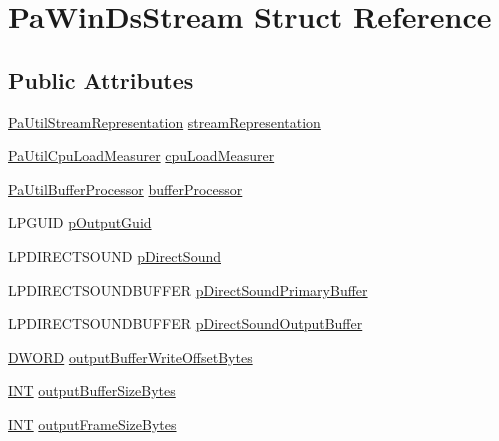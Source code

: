 \hypertarget{struct_pa_win_ds_stream}{}\section{Pa\+Win\+Ds\+Stream Struct Reference}
\label{struct_pa_win_ds_stream}
\subsection*{Public Attributes}
\begin{DoxyCompactItemize}
\item 
\hyperlink{struct_pa_util_stream_representation}{Pa\+Util\+Stream\+Representation} \hyperlink{struct_pa_win_ds_stream_a83364a8bef2314f9122dc397155d614a}{stream\+Representation}
\item 
\hyperlink{struct_pa_util_cpu_load_measurer}{Pa\+Util\+Cpu\+Load\+Measurer} \hyperlink{struct_pa_win_ds_stream_a607c1644f8f390244723e854e30cf167}{cpu\+Load\+Measurer}
\item 
\hyperlink{struct_pa_util_buffer_processor}{Pa\+Util\+Buffer\+Processor} \hyperlink{struct_pa_win_ds_stream_a9c2310a757d9246b054f6bb66e408806}{buffer\+Processor}
\item 
L\+P\+G\+U\+ID \hyperlink{struct_pa_win_ds_stream_a79765ea75ed4b2c47a077db25cd9b66e}{p\+Output\+Guid}
\item 
L\+P\+D\+I\+R\+E\+C\+T\+S\+O\+U\+ND \hyperlink{struct_pa_win_ds_stream_a463a306d8ee5fafbb86d0ffe16574b8c}{p\+Direct\+Sound}
\item 
L\+P\+D\+I\+R\+E\+C\+T\+S\+O\+U\+N\+D\+B\+U\+F\+F\+ER \hyperlink{struct_pa_win_ds_stream_a722c711a49c112dd449a310021f6a434}{p\+Direct\+Sound\+Primary\+Buffer}
\item 
L\+P\+D\+I\+R\+E\+C\+T\+S\+O\+U\+N\+D\+B\+U\+F\+F\+ER \hyperlink{struct_pa_win_ds_stream_a78946544af5046dd6ba8c723e849d1bb}{p\+Direct\+Sound\+Output\+Buffer}
\item 
\hyperlink{mapinls_8h_ad342ac907eb044443153a22f964bf0af}{D\+W\+O\+RD} \hyperlink{struct_pa_win_ds_stream_aba0e8e56c34492d73283950d0dac83e9}{output\+Buffer\+Write\+Offset\+Bytes}
\item 
\hyperlink{vr32_8c_a77387b8d37d173f242ab062e4f4c0cac}{I\+NT} \hyperlink{struct_pa_win_ds_stream_ae737c04ba94374539a74220fe52931f7}{output\+Buffer\+Size\+Bytes}
\item 
\hyperlink{vr32_8c_a77387b8d37d173f242ab062e4f4c0cac}{I\+NT} \hyperlink{struct_pa_win_ds_stream_a6259cccdde91a75238760247fde2406b}{output\+Frame\+Size\+Bytes}

\end{DoxyCompactItemize}

